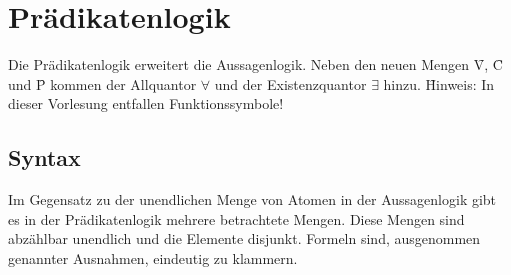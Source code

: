 \newcommand{\INT}{\mathcal{I}}
\newcommand{\ZUW}{\mathcal{Z}}
\newcommand{\FM}{\mathcal{T}}

\section{Prädikatenlogik}
Die Prädikatenlogik erweitert die Aussagenlogik. Neben den neuen Mengen \f{V}, \f{C} und \f{P} kommen der Allquantor $\forall$ und der Existenzquantor $\exists$ hinzu. \f{Hinweis:} In dieser Vorlesung entfallen Funktionssymbole! 
\subsection{Syntax}
    Im Gegensatz zu der unendlichen Menge von Atomen in der Aussagenlogik gibt es in der Prädikatenlogik mehrere betrachtete Mengen. Diese Mengen sind abzählbar unendlich und die Elemente disjunkt. Formeln sind, ausgenommen genannter Ausnahmen, eindeutig zu klammern. 
